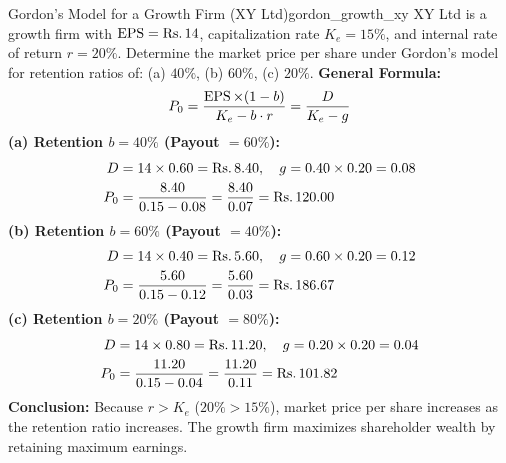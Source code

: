 \begin{example}{Gordon's Model for a Growth Firm (XY Ltd)}{gordon_growth_xy}
XY Ltd is a growth firm with $\operatorname{EPS} = \text{Rs.}\, 14$, capitalization rate $K_e = 15\%$, and internal rate of return $r = 20\%$. Determine the market price per share under Gordon's model for retention ratios of: (a) $40\%$, (b) $60\%$, (c) $20\%$.
\tcblower
\textbf{General Formula:}
\begin{equation*}
    P_0 = \frac{\operatorname{EPS} \times (1 - b)}{K_e - b \cdot r} = \frac{D}{K_e - g}
\end{equation*}
\textbf{(a) Retention $b = 40\%$ (Payout $= 60\%$):}
\begin{align*}
    D &= 14 \times 0.60 = \text{Rs.}\, 8.40, \quad g = 0.40 \times 0.20 = 0.08 \\
    P_0 &= \frac{8.40}{0.15 - 0.08} = \frac{8.40}{0.07} = \text{Rs.}\, 120.00
\end{align*}
\textbf{(b) Retention $b = 60\%$ (Payout $= 40\%$):}
\begin{align*}
    D &= 14 \times 0.40 = \text{Rs.}\, 5.60, \quad g = 0.60 \times 0.20 = 0.12 \\
    P_0 &= \frac{5.60}{0.15 - 0.12} = \frac{5.60}{0.03} = \text{Rs.}\, 186.67
\end{align*}
\textbf{(c) Retention $b = 20\%$ (Payout $= 80\%$):}
\begin{align*}
    D &= 14 \times 0.80 = \text{Rs.}\, 11.20, \quad g = 0.20 \times 0.20 = 0.04 \\
    P_0 &= \frac{11.20}{0.15 - 0.04} = \frac{11.20}{0.11} = \text{Rs.}\, 101.82
\end{align*}
\textbf{Conclusion:} Because $r > K_e$ ($20\% > 15\%$), market price per share increases as the retention ratio increases. The growth firm maximizes shareholder wealth by retaining maximum earnings.
\end{example}

